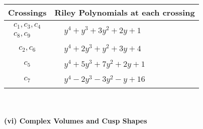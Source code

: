 \documentclass[1p]{elsarticle_modified}
\theoremstyle{definition}
\begin{document}
\begin{tabular}{m{50pt}|m{274pt}}
Crossings & \hspace{64pt}Riley Polynomials at each crossing \\
\hline $$\begin{aligned}c_{1},c_{3},c_{4}\\c_{8},c_{9}\end{aligned}$$&$\begin{aligned}
&y^4+y^3+3 y^2+2 y+1
\end{aligned}$\\
\hline $$\begin{aligned}c_{2},c_{6}\end{aligned}$$&$\begin{aligned}
&y^4+2 y^3+y^2+3 y+4
\end{aligned}$\\
\hline $$\begin{aligned}c_{5}\end{aligned}$$&$\begin{aligned}
&y^4+5 y^3+7 y^2+2 y+1
\end{aligned}$\\
\hline $$\begin{aligned}c_{7}\end{aligned}$$&$\begin{aligned}
&y^4-2 y^3-3 y^2- y+16
\end{aligned}$\\
\hline
\end{tabular}\\~\\
\newpage\flushleft \textbf{(vi) Complex Volumes and Cusp Shapes}
\end{document}
